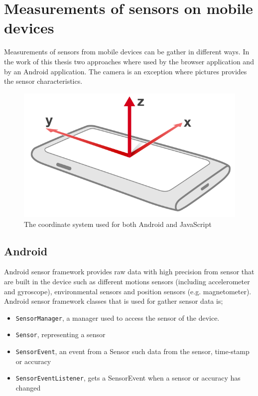 \section{Measurements of sensors on mobile devices}
Measurements of sensors from mobile devices can be gather in different ways. In the work of this thesis two approaches where used by the browser application and by an Android application. The camera is an exception where pictures provides the sensor characteristics.
\begin{figure}[H]
	\centering
    \includegraphics[scale=0.2]{img/device-axes}
    \caption{The coordinate system used for both Android and JavaScript\cite[]{sensor:DeviceOrientation:spec}}
  \label{fig:device-axes}
\end{figure}

\subsection{Android}
Android sensor framework provides raw data with high precision from sensor that are built in the device such as different motions sensors (including accelerometer and gyroscope), environmental sensors and position sensors (e.g. magnetometer). \cite[]{android:sensor}
Android sensor framework classes that is used for gather sensor data is; 
\begin{itemize}
	\item[] \texttt{SensorManager}, a manager used to access the sensor of the device. 
	\item[] \texttt{Sensor}, representing a sensor
	\item[] \texttt{SensorEvent}, an event from a Sensor such data from the sensor, time-stamp or accuracy
	\item[] \texttt{SensorEventListener}, gets a SensorEvent when a sensor or accuracy has changed 
\end{itemize}


